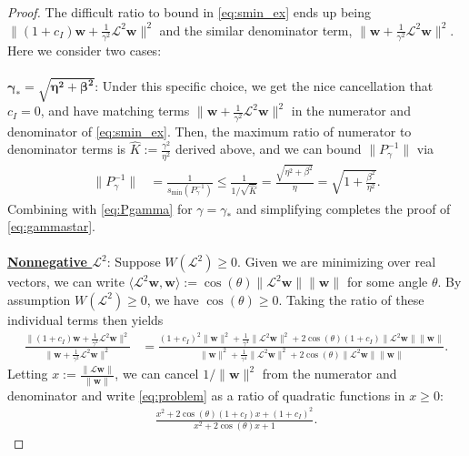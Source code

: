 \documentclass[a4paper,10pt]{article}
\begin{document}
\begin{proof}
The difficult ratio to bound in \eqref{eq:smin_ex} ends up being 
$\|(1+c_I)\mathbf{w}+\tfrac{1}{\gamma^2}\mathcal{L}^2\mathbf{w}\|^2$ and the
similar denominator term, $\|\mathbf{w}+\tfrac{1}{\gamma^2}\mathcal{L}^2\mathbf{w}\|^2$.
Here we consider two cases:\\
\\
\underline{$\boldsymbol{\gamma_* = \sqrt{\eta^2+\beta^2}}$}: Under this specific choice, we
get the nice cancellation that $c_I = 0$, and have matching terms
$\|\mathbf{w}+\tfrac{1}{\gamma^2}\mathcal{L}^2\mathbf{w}\|^2$ in the numerator
and denominator of \eqref{eq:smin_ex}. Then, the maximum ratio of numerator 
to denominator terms is $\widehat{K} := \tfrac{\gamma^2}{\eta^2}$ derived above,
and we can bound $\|P_{\gamma}^{-1}\|$ via
%
\begin{align}\label{eq:gammas_bound}
\|P_{\gamma}^{-1}\| & = \frac{1}{s_{\min}(P_{\gamma}^{-1})} 
	\leq \frac{1}{1/\sqrt{\widehat{K}}} 
	= \frac{\sqrt{\eta^2+\beta^2}}{\eta} =
	\sqrt{1+\frac{\beta^2}{\eta^2}}.
\end{align}
%
Combining with \eqref{eq:Pgamma} for $\gamma = \gamma_*$ and simplifying
completes the proof of \eqref{eq:gammastar}.\\
\\
\noindent
\underline{\textbf{Nonnegative $\mathcal{L}^2$}}: Suppose $W(\mathcal{L}^2) \geq 0$.
Given we are minimizing over real vectors, we can write $\langle\mathcal{L}^2\mathbf{w},
\mathbf{w} \rangle := \cos(\theta)\|\mathcal{L}^2\mathbf{w}\|\|\mathbf{w}\|$ for some
angle $\theta$. By assumption $W(\mathcal{L}^2) \geq 0$, we have $\cos(\theta)\geq 0$.
Taking the ratio of these individual terms then yields
%
\begin{align}\label{eq:problem}
\frac{\|(1+c_I)\mathbf{w}+\tfrac{1}{\gamma^2}\mathcal{L}^2\mathbf{w}\|^2}
	{\|\mathbf{w}+\tfrac{1}{\gamma^2}\mathcal{L}^2\mathbf{w}\|^2}
& = \frac{(1+c_I)^2\|\mathbf{w}\|^2+\tfrac{1}{\gamma^4}\|\mathcal{L}^2\mathbf{w}\|^2
	+ 2\cos(\theta)(1+c_I)\|\mathcal{L}^2\mathbf{w}\|\|\mathbf{w}\|}
	{\|\mathbf{w}\|^2+\tfrac{1}{\gamma^4}\|\mathcal{L}^2\mathbf{w}\|^2
	+ 2\cos(\theta)\|\mathcal{L}^2\mathbf{w}\|\|\mathbf{w}\|}.
\end{align}
%
Letting $x := \tfrac{\|\mathcal{L}\mathbf{w}\|}{\|\mathbf{w}\|}$, we can
cancel $1/\|\mathbf{w}\|^2$ from the numerator and denominator and
write \eqref{eq:problem} as a ratio of quadratic functions in $x \geq 0$:
%
\begin{align}\label{eq:x_simp}
\frac{x^2 + 2\cos(\theta)(1+c_I)x + (1+c_I)^2}{x^2 + 2\cos(\theta)x + 1}.

\end{align}
\end{proof}
\end{document}

